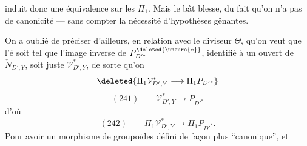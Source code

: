 induit donc une équivalence sur les $\Pi_1$. Mais le bât blesse, du fait qu'on n'a pas de canonicité --- sans compter la nécessité d'hypothèses  gênantes. 

On a oublié de préciser d'ailleurs, en relation avec le diviseur $\Theta$, qu'on veut que l'é soit tel que l'image inverse de $P^{\deleted{\unsure{*}}}_{D'^{*}}$, identifié à un ouvert de  $\check N_{D',Y}$, soit juste $\mathcal V^{*}_{D',Y}$, de sorte qu'on   
\[
\deleted{\Pi_1\mathcal V^{*}_{D',Y}\longrightarrow\Pi_1P_{D'^{*}}}
\]
\[
(241)\qquad\mathcal V^{*}_{D',Y}\longrightarrow P_{D'^{*}}
\]
d'où
\[
(242)\qquad\Pi_1\mathcal V^{*}_{D',Y}\longrightarrow\Pi_1P_{D'^{*}}.
\]
Pour avoir un morphisme de groupoïdes défini de façon plus ``canonique'', et
